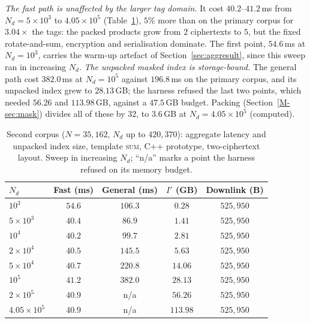 \documentclass[11pt,a4paper]{article}
\newcommand{\mref}[1]{\ref{M-#1}}
\newlength{\tblwidth}\setlength{\tblwidth}{\linewidth}
\begin{document}
\emph{The fast path is unaffected by the larger tag domain.} It cost
$40.2$--$41.2$\,ms from $N_d=5\times10^3$ to $4.05\times10^5$
(Table~\ref{tab:beijing}), $5\%$ more than on the primary corpus for
$3.04\times$ the tags: the packed products grow from $2$ ciphertexts to $5$,
but the fixed rotate-and-sum, encryption and serialisation dominate. The first
point, $54.6$\,ms at $N_d=10^3$, carries the warm-up artefact of
Section~\ref{sec:aggresult}, since this sweep ran in increasing $N_d$.
\emph{The unpacked masked index is storage-bound.} The general path cost
$382.0$\,ms at $N_d=10^5$ against $196.8$\,ms on the primary corpus, and its
unpacked index grew to $28.13$\,GB; the harness refused the last two points,
which needed $56.26$ and $113.98$\,GB, against a $47.5$\,GB budget. Packing
(Section~\mref{sec:mask}) divides all of these by $32$, to $3.6$\,GB at
$N_d=4.05\times10^5$ (computed).

\begin{table}[htbp]
\caption{Second corpus ($N=35{,}162$, $N_d$ up to $420{,}370$): aggregate
latency and unpacked index size, template \textsc{sum}, C++ prototype,
two-ciphertext layout. Sweep in increasing $N_d$; ``n/a'' marks a point the
harness refused on its memory budget.}
\label{tab:beijing}
\centering
\footnotesize
\setlength{\tabcolsep}{3pt}
\begin{tabular*}{\tblwidth}{@{\extracolsep{\fill}}lcccc@{}}
\toprule
$N_d$ & Fast (ms) & General (ms) & $I'$ (GB) & Downlink (B) \\
\midrule
$10^3$             & $54.6$ & $106.3$ & $0.28$   & $525{,}950$ \\
$5\times10^3$      & $40.4$ & $86.9$  & $1.41$   & $525{,}950$ \\
$10^4$             & $40.2$ & $99.7$  & $2.81$   & $525{,}950$ \\
$2\times10^4$      & $40.5$ & $145.5$ & $5.63$   & $525{,}950$ \\
$5\times10^4$      & $40.7$ & $220.8$ & $14.06$  & $525{,}950$ \\
$10^5$             & $41.2$ & $382.0$ & $28.13$  & $525{,}950$ \\
$2\times10^5$      & $40.9$ & n/a     & $56.26$  & $525{,}950$ \\
$4.05\times10^5$   & $40.9$ & n/a     & $113.98$ & $525{,}950$ \\
\bottomrule
\end{tabular*}
\end{table}
\end{document}
